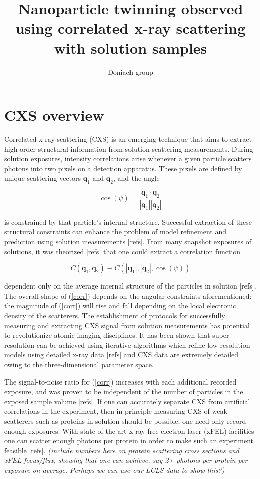 \documentclass [11pt,fleqn]{article}
\title{Nanoparticle twinning observed using correlated x-ray scattering with solution samples}
\author{Doniach group}
\date{}
\def \be {\begin{equation}}
\def \ee {\end{equation}}
\begin{document}
 
\maketitle




\section{CXS overview}

Correlated x-ray scattering (CXS) is an emerging technique that aims to extract high order structural information from solution scattering measurements. During solution exposures, intensity correlations arise whenever a given particle scatters photons into two pixels on a detection apparatus. These pixels are defined by unique scattering vectors $\bm q_1$ and $\bm q_2$, and the angle

\be
\cos ( \psi) = \frac{\bm q_1 \cdot \bm q_2}{|\bm q_1| |\bm q_2| } 
\ee

is constrained by that particle's internal structure. Successful extraction of these structural constraints can enhance the problem of model refinement and prediction using solution measurements [refs]. From many snapshot exposures of solutions, it was theorized [refs] that one could extract a correlation function

\be \label{corr}
C(\bm q_1, \bm q_2) \equiv C(|\bm q_1|,| \bm q_2|,\cos (\psi) ) 
\ee

dependent only on the average internal structure of the particles in solution [refs]. The overall shape of (\ref{corr}) depends on the angular constraints aforementioned: the magnitude of (\ref{corr}) will rise and fall depending on the local electronic density of the scatterers. The establishment of protocols for successfully measuring and extracting CXS signal from solution measurements has potential to revolutionize atomic imaging disciplines. It has been shown that super-resolution can be achieved using iterative algorithms which refine low-resolution models using detailed x-ray data [refs] and CXS data are extremely detailed owing to the three-dimensional parameter space. 

The signal-to-noise ratio for (\ref{corr}) increases with each additional recorded exposure, and was proven to be independent of the number of particles in the exposed sample volume [refs]. If one can accurately separate CXS from artificial correlations in the experiment, then in principle measuring CXS of weak scatterers such as proteins in solution should be possible; one need only record enough exposures. With state-of-the-art x-ray free electron laser (xFEL) facilities one can scatter enough photons per protein in order to make such an experiment feasible [refs]. \emph{(include numbers here on protein scattering cross sections and xFEL focus/flux, showing that one can achieve, say 2+ photons per protein per exposure on average. Perhaps we can use our LCLS data to show this?)}
\end{document}
